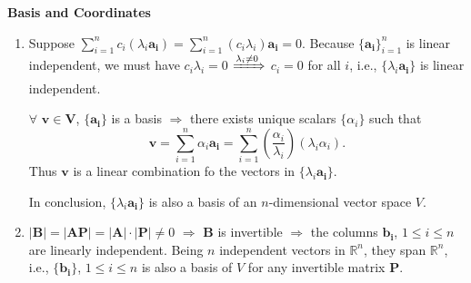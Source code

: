 \documentclass[11pt,letter,notitlepage]{article}
\theoremstyle{definition}
\begin{document}
	\newpage

	\begin{solution}\textbf{Basis and Coordinates}
		\begin{enumerate}
			\item 
			Suppose $\sum\limits_{i = 1}^{n} c_i (\lambda_i \mathbf{a_i}) = \sum\limits_{i = 1}^{n} (c_i \lambda_i) \mathbf{a_i} = 0$. Because $\{\mathbf{a_i}\}_{i = 1}^{n}$ is linear independent, we must have $c_i \lambda_i = 0$ $\xRightarrow{\lambda_i \neq 0}$ $c_i = 0$ for all $i$, i.e., $\{\lambda_i \mathbf{a_i}\}$ is linear independent.

			$\forall$ $\mathbf{v} \in \mathbf{V}$, $\{\mathbf{a_i}\}$ is a basis $\Longrightarrow$ there exists unique scalars $\{\alpha_i\}$ such that
			\[
			\mathbf{v}
			=
			\sum\limits_{i = 1}^{n}\alpha_i \mathbf{a_i}
			=
			\sum\limits_{i = 1}^{n}\left(\frac{\alpha_i}{\lambda_i}\right)(\lambda_i \alpha_i).
			\]
			Thus $\mathbf{v}$ is a linear combination fo the vectors in $\{\lambda_i \mathbf{a_i}\}$.

			In conclusion, $\{\lambda_i \mathbf{a_i}\}$ is also a basis of an $n$-dimensional vector space $V$.
			\item 
			$|\mathbf{B}| = |\mathbf{AP}| = |\mathbf{A}|\cdot|\mathbf{P}| \neq 0$ $\Longrightarrow$ $\mathbf{B}$ is invertible $\Longrightarrow$ the columns $\mathbf{b_i}$, $1 \leq i \leq n$ are linearly independent. Being $n$ independent vectors in $\mathbb{R}^n$, they span $\mathbb{R}^n$, i.e., $\{\mathbf{b_i}\}$, $1 \leq i \leq n$ is also a basis of $V$ for any invertible  matrix $\mathbf{P}$.


\end{enumerate}
\end{solution}
\end{document}
